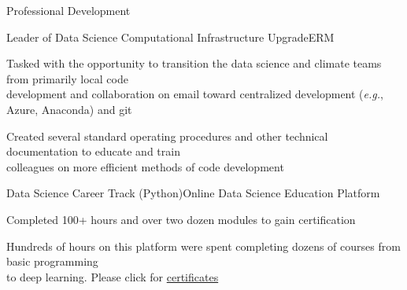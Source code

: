 \documentclass{resume} %
\newcommand{\commentblock}[1]{}
\begin{document}
\begin{rSection}{Professional Development} 
\begin{rSubsection}{Leader of Data Science Computational Infrastructure Upgrade}{}{ERM}{}
\item {Tasked with the opportunity to transition the data science and climate teams from primarily local code \\ development and collaboration on email toward centralized development (\emph{e.g.}, Azure, Anaconda) and git}
\item {Created several standard operating procedures and other technical documentation to educate and train \\ colleagues on more efficient methods of code development}
\end{rSubsection}

\commentblock{
    \begin{rSubsection}{Hands-On MLOps Workshop in Azure}{}{Microsoft}{}
    \item {Completed an eight hour hands-on lab with Microsoft Azure specialists to grow fundamental \\ skills in building reproducible and maintainable ML products}
    \item {This workshop was a stepping stone in developing the experience to becoming an end-to-end \\ concept to production data scientist}
    \end{rSubsection}
}

\begin{rSubsection}{Data Science Career Track (Python)}{}{Online Data Science Education Platform}{}
\item {Completed 100+ hours and over two dozen modules to gain certification}
\item {Hundreds of hours on this platform were spent completing dozens of courses from basic programming \\ to deep learning. Please click for \href{https://github.com/907Resident/Certifications}{certificates}}
\end{rSubsection}




\end{rSection} 
\end{document}
